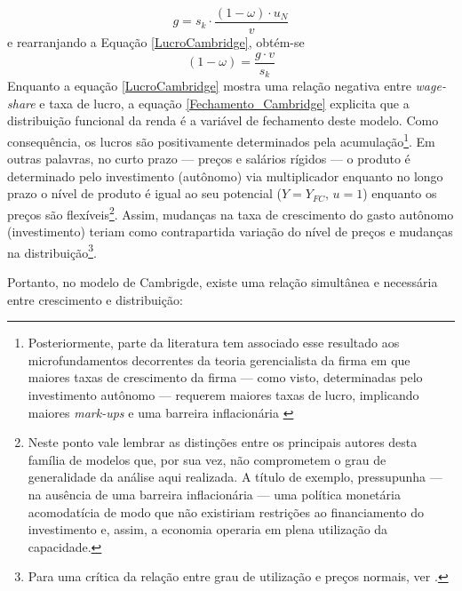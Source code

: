 \begin{equation}
g = s_k\cdot \frac{(1-\omega)\cdot u_N}{v}
\end{equation}
e rearranjando a Equação \ref{LucroCambridge}, obtém-se
\begin{equation}
\label{Fechamento_Cambridge}
(1-\omega) = \frac{g\cdot v}{s_k}
\end{equation}
Enquanto a equação \ref{LucroCambridge} mostra uma relação negativa entre \textit{wage-share} e taxa de lucro, a equação \ref{Fechamento_Cambridge} explicita que a distribuição funcional da renda é a variável de fechamento deste modelo.  Como consequência, os lucros são positivamente determinados pela acumulação\footnote{
	Posteriormente, parte da literatura tem associado esse resultado aos microfundamentos decorrentes da teoria gerencialista da firma em que maiores taxas de crescimento da firma --- como visto, determinadas pelo investimento autônomo --- requerem maiores taxas de lucro, implicando maiores \textit{mark-ups} e uma barreira inflacionária \cite[p.~353]{lavoie_post-keynesian_2015}
}. 
Em outras palavras, no curto prazo --- preços e salários rígidos --- o produto é determinado pelo investimento (autônomo) via multiplicador enquanto no longo prazo o nível de produto é igual ao seu potencial ($Y = Y_{FC}, \,u=1$) enquanto os preços são flexíveis\footnote{
	Neste ponto vale lembrar as distinções entre os principais autores desta família de modelos que, por sua vez, não comprometem o grau de generalidade da análise aqui realizada. 
	A título de exemplo, \textcite{robinson_model_1962} pressupunha --- na ausência de uma barreira inflacionária --- uma política monetária acomodatícia de modo que não existiriam restrições ao financiamento do investimento e, assim, a economia operaria em plena utilização da capacidade.
}. Assim, mudanças na taxa de crescimento do gasto autônomo (investimento) teriam como contrapartida variação do nível de preços e mudanças na distribuição\footnote{Para uma crítica da relação entre grau de utilização e preços normais, ver \textcite{ciccone_2017}.}. 

Portanto, no modelo de Cambrigde, existe uma relação simultânea e necessária entre crescimento e distribuição:

